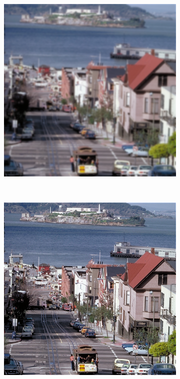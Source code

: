 \begin{figure}[ht]
    \centering
    \caption{Samples from the CSIQ database: blurred image (a) and sharp image (b).}
    \label{fig:csiq_example}
    \begin{subfigure}[t]{0.45\textwidth}
        \centering
        \includegraphics[scale=0.3]{images/csiq_blurred.png}
        \caption{}
    \end{subfigure}%
    ~ 
    \begin{subfigure}[t]{0.5\textwidth}
        \centering
        \includegraphics[scale=0.3]{images/csiq_sharp.png}
        \caption{}
    \end{subfigure}
    \centering
\end{figure}



